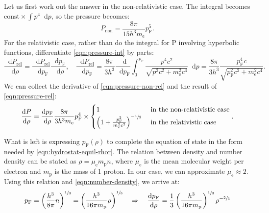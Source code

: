 \documentclass[]{article}
\newcommand{\dd}{\mathop{}\!\mathrm{d}}
\newcommand{\fermiMtm}{p_\mathrm{F}}
\newcommand{\massElectron}{m_\mathrm{e}}
\newcommand{\massProton}{m_\mathrm{p}}
\begin{document}
	Let us first work out the answer in the non-relativistic case. The integral becomes $\text{const} \times \int p^4 \dd p$, so the pressure becomes:
	\begin{equation}\label{eqn:pressure-non-rel}
		P_\mathrm{non} = \frac{8 \pi}{15 h^3 \massElectron} \fermiMtm^5.
	\end{equation}
	For the relativistic case, rather than do the integral for P involving hyperbolic functions, differentiate \eqref{eqn:pressure-int} by parts:
	\begin{equation}\label{eqn:pressure-rel}
		\frac{\dd P_\mathrm{rel}}{\dd \rho} = \frac{\dd P_\mathrm{rel}}{\dd \fermiMtm} \frac{\dd \fermiMtm}{\dd \rho}, \quad \frac{\dd P_\mathrm{rel}}{\dd \fermiMtm} = \frac{8\pi}{3h^3}\frac{\dd}{\dd \fermiMtm}\int_0^{\fermiMtm} \frac{p^4 c^2}{\sqrt{p^2c^2 + \massElectron^2 c^4}} \dd p = \frac{8\pi}{3h^3} \frac{\fermiMtm^4 c}{\sqrt{\fermiMtm^2c^2 + \massElectron^2 c^4}}.
	\end{equation}
	We can collect the derivative of \eqref{eqn:pressure-non-rel} and the result of \eqref{eqn:pressure-rel}:
	\begin{equation}\label{eqn:pressure-both}
		\frac{\dd P}{\dd \rho} = \frac{\dd \fermiMtm}{\dd \rho}\frac{8 \pi}{3 h^3 \massElectron} \fermiMtm^4 \times \begin{cases}
			1 & \text{ in the non-relativistic case} \\
			\left(1 + \frac{\fermiMtm^2}{\massElectron^2 c^2}\right)^{-\sfrac{1}{2}} & \text{ in the relativistic case}
		\end{cases}.
 	\end{equation}

	What is left is expressing $\fermiMtm (\rho)$ to complete the equation of state in the form needed by \eqref{eqn:hydrostat-equil-rhor}. The relation between density and number density can be stated as $\rho = \mu_\mathrm{e} \massProton n$, where $\mu_\mathrm{e}$ is the mean molecular weight per electron and $\massProton$ is the mass of 1 proton. In our case, we can approximate $\mu_\mathrm{e} \approx 2$. Using this relation and \eqref{eqn:number-density}, we arrive at:
	\begin{equation}\label{eqn:fermi-mtm}
		\fermiMtm = \left( \frac{h^3}{8 \pi} n \right)^{\sfrac{1}{3}} = \left( \frac{h^3}{16 \pi \massProton} \rho\right)^{\sfrac{1}{3}} \quad \Rightarrow \quad \frac{\dd \fermiMtm}{\dd \rho} = \frac{1}{3} \left( \frac{h^3}{16 \pi \massProton}\right)^{\sfrac{1}{3}} \rho^{-\sfrac{2}{3}}
	\end{equation}
\end{document}
